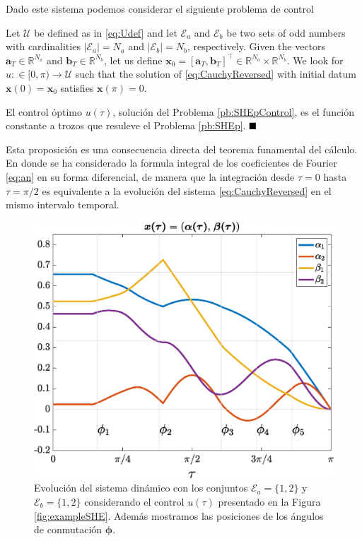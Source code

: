 %
Dado este sistema podemos considerar el siguiente problema de control
\vspace{1em}
\begin{problem}\label{pb:SHEpControl}
    Let $\mathcal{U}$ be defined as in \eqref{eq:Udef} and let $\mathcal{E} _a $ and $\mathcal{E} _b $ be two sets of odd numbers with cardinalities $|\mathcal{E}_a| = N_a $ and $ |\mathcal{E} _b| = N_b$, respectively. Given the vectors $\bm{a}_T \in \mathbb{R}^{N_a}$ and $\bm{b}_T \in \mathbb{R}^{N_b} $, let us define $\bm{x}_0=[\bm{a}_T,\bm{b}_T]^\top \in \mathbb{R}^{N_a}\times\mathbb{R}^{N_b}$. We look for $u:\in [0,\pi)\to\mathcal{U}$ such that the solution of \eqref{eq:CauchyReversed} with initial datum $\bm{x}(0)=\bm{x}_0$ satisfies $\bm{x}(\pi)=0$.
\end{problem}
\vspace{1em}

\begin{theorem}\label{th:SHEasDyn}
    El control óptimo $u(\tau)$, solución del Problema \ref{pb:SHEpControl}, es el función constante a trozos que resuleve el Problema \ref{pb:SHEp}.   
    $\hfill \blacksquare$
\end{theorem}

Esta proposición es una consecuencia directa del teorema funamental del cálculo. En donde se ha considerado la formula integral de los coeficientes de Fourier \eqref{eq:an} en su forma diferencial, de manera que la integración desde $\tau = 0 $ hasta $\tau = \pi/2$ es equivalente a la evolución del sistema \eqref{eq:CauchyReversed} en el mismo intervalo temporal.

\begin{figure}[ht!] 
    \centering
    \includegraphics[scale=0.35]{img/fig02.eps}
    \caption{Evolución del sistema dinámico con los conjuntos $\mathcal{E}_a = \{1,2\}$ y $\mathcal{E}_b = \{1,2\}$ considerando el control $u(\tau)$ presentado en la Figura \ref{fig:exampleSHE}. Además mostramos las posiciones de los ángulos de conmutación $\bm{\phi}$.}
\end{figure}

